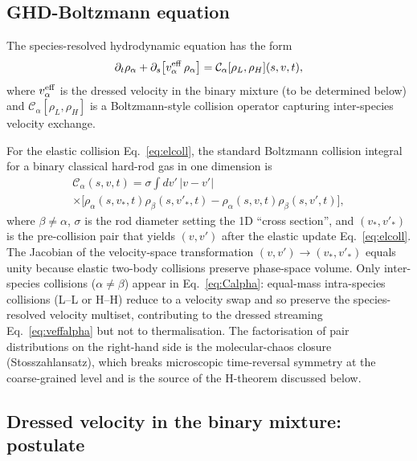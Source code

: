 \documentclass[aps,pre,twocolumn,superscriptaddress,longbibliography,floatfix]{revtex4-2}
\begin{document}
\subsection{GHD-Boltzmann equation}

The species-resolved hydrodynamic equation has the form
\begin{equation}
\partial_t \rho_\alpha + \partial_s\!\left[v^{\rm eff}_\alpha\,\rho_\alpha\right]
= \mathcal{C}_\alpha[\rho_L,\rho_H](s,v,t),
\label{eq:ghdboltz}
\end{equation}
where $v^{\rm eff}_\alpha$ is the dressed velocity in the binary
mixture (to be determined below) and
$\mathcal{C}_\alpha[\rho_L,\rho_H]$ is a Boltzmann-style
collision operator capturing inter-species velocity exchange.

For the elastic collision Eq.~\eqref{eq:elcoll}, the standard
Boltzmann collision integral for a binary classical
hard-rod gas in one dimension is
\begin{multline}
\mathcal{C}_\alpha(s,v,t)
= \sigma\!\int\!dv'\,|v-v'|\\
\times \big[\rho_\alpha(s,v_*,t)\rho_\beta(s,v'_*,t)
           - \rho_\alpha(s,v,t)\rho_\beta(s,v',t)\big],
\label{eq:Calpha}
\end{multline}
where $\beta\neq\alpha$, $\sigma$ is the rod diameter setting
the 1D ``cross section'', and $(v_*,v'_*)$ is the pre-collision
pair that yields $(v,v')$ after the elastic update
Eq.~\eqref{eq:elcoll}. The Jacobian of the velocity-space
transformation $(v,v')\!\to\!(v_*,v'_*)$ equals unity because
elastic two-body collisions preserve phase-space volume.
Only inter-species collisions ($\alpha\neq\beta$) appear in
Eq.~\eqref{eq:Calpha}: equal-mass intra-species collisions
(L--L or H--H) reduce to a velocity swap and so preserve the
species-resolved velocity multiset, contributing to the dressed
streaming Eq.~\eqref{eq:veffalpha} but not to thermalisation.
The factorisation of pair distributions on the right-hand
side is the molecular-chaos closure (Stosszahlansatz), which
breaks microscopic time-reversal symmetry at the coarse-grained
level and is the source of the H-theorem discussed below.

\subsection{Dressed velocity in the binary mixture: postulate}
\end{document}
